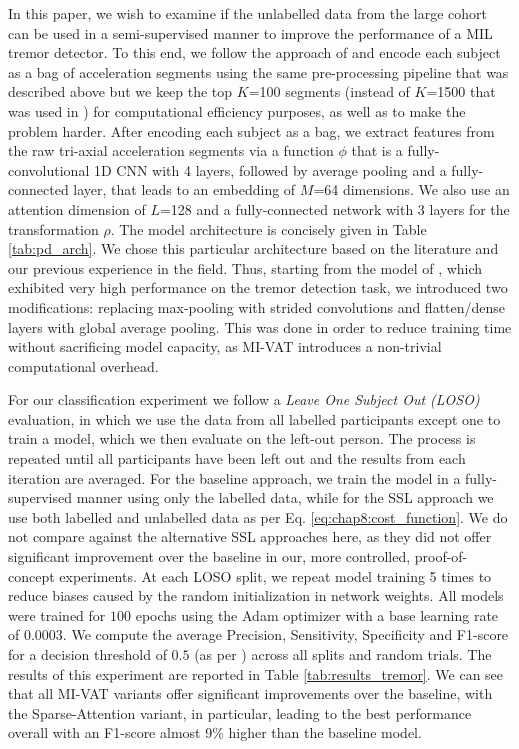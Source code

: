\documentclass[journal,twoside,web]{ieeecolor}
\begin{document}
In this paper, we wish to examine if the unlabelled data from the large cohort
can be used in a semi-supervised manner to improve the performance of a MIL
tremor detector. To this end, we follow the approach of
\cite{alpapado2019tremor} and encode each subject as a bag of acceleration
segments using the same pre-processing pipeline that was described above but we
keep the top $K$=100 segments (instead of $K$=1500 that was used in
\cite{alpapado2019tremor}) for computational efficiency purposes, as well as to
make the problem harder. After encoding each subject as a bag, we extract
features from the  raw tri-axial acceleration segments via a function $\phi$
that is a fully-convolutional 1D CNN with 4 layers, followed by average  pooling
and a fully-connected layer, that leads to an embedding  of $M$=64 dimensions.
We also use an attention dimension of $L$=128 and a fully-connected network with
3 layers for the transformation $\rho$. The model  architecture is concisely
given in Table \ref{tab:pd_arch}. We chose this particular architecture  based
on the literature and our previous experience in the field. Thus, starting from the
model of \cite{alpapado2019tremor}, which exhibited very high performance on the
tremor detection task, we introduced two modifications: replacing max-pooling
with strided convolutions and flatten/dense layers with global average pooling.
This was done in order to reduce training time without sacrificing model
capacity, as MI-VAT introduces a non-trivial computational overhead.

For our classification experiment we follow a \emph{Leave One Subject Out
(LOSO)} evaluation, in which we use the data from all labelled participants
except one to train a model, which we then evaluate on the left-out person. The
process is repeated until all participants have been left out and the results
from  each iteration are averaged.  For the baseline approach, we train the
model in a fully-supervised manner using only the labelled data, while for the
SSL approach we use both labelled and unlabelled data as per Eq.
\ref{eq:chap8:cost_function}. We do not compare against the alternative SSL
approaches here, as they did not offer significant improvement over the baseline
in our, more controlled, proof-of-concept experiments.  At each LOSO split, we
repeat model training 5 times to reduce biases caused by the random
initialization in network weights. All models were trained for $100$ epochs
using the Adam optimizer with  a base learning rate of $0.0003$. We compute the
average Precision, Sensitivity, Specificity and F1-score for a decision
threshold of $0.5$ (as per \cite{alpapado2019tremor}) across all splits and
random trials. The results of this experiment are reported in Table
\ref{tab:results_tremor}. We can see that all MI-VAT variants offer significant
improvements over the baseline, with the Sparse-Attention
variant, in particular, leading to the best performance
overall with an F1-score almost 9\% higher than the baseline model. 
\end{document}
